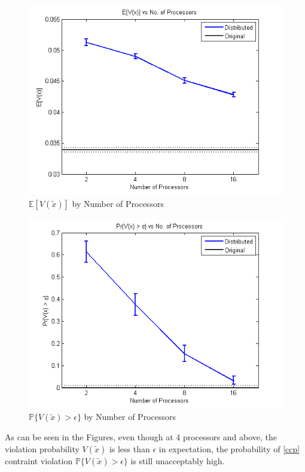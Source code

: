 \documentclass[12pt]{article}
\begin{document}
\begin{figure}[ht]
	\centering
		\includegraphics[scale=0.9]{../plot/figs/expviolprob_numproc.png}
	\caption{$\mathbb{E}[V(\tilde{x})]$ by Number of Processors}
	\label{fig:expviolprob_numproc}
\end{figure}

\begin{figure}[ht]
	\centering
		\includegraphics[scale=0.9]{../plot/figs/probviolprobgreateps_numproc.png}
	\caption{$\mathbb{P}\{V(\tilde{x}) > \epsilon \}$ by Number of Processors}
	\label{fig:probviolprobgreateps_numproc}
\end{figure}

As can be seen in the Figures, even though at 4 processors and above, the violation probability $V(\tilde{x})$ is less than $\epsilon$ in expectation, the probability of \ref{ccp} contraint violation $\mathbb{P}\{V(\tilde{x}) > \epsilon \}$ is still unacceptably high.
\end{document}
